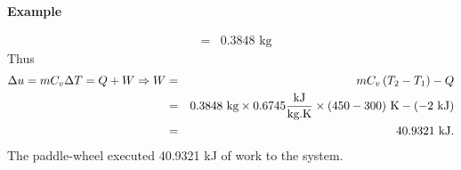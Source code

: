 \begin{MyExample}{\begin{center}{\bf Example}\end{center}}
\begin{eqnarray}
                                                      &=& 0.3848\text{ kg}\nonumber
       \end{eqnarray}
       Thus
       \begin{eqnarray}
          \Delta u = m C_{v}\Delta T = Q + W \Rightarrow W &=& m C_{v}\left(T_{2}-T_{1}\right) - Q \nonumber \\
                                                          &=& 0.3848\text{ kg} \times 0.6745 \displaystyle\frac{\text{kJ}}{\text{kg.K}}\times (450-300)\text{ K} - (-2 \text{ kJ}) \nonumber \\
                                                          &=& 40.9321\text{ kJ}. \nonumber
       \end{eqnarray}
       The paddle-wheel executed 40.9321 kJ of work to the system.
   \end{MyExample}
   
